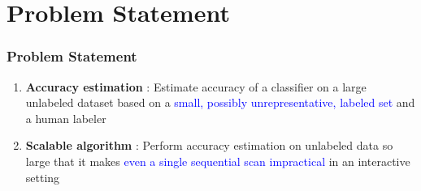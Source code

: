 \documentclass[11pt]{beamer}
\newlength{\wideitemsep}
\let\olditem\item
\renewcommand{\item}{\setlength{\itemsep}{\wideitemsep}\olditem}
\begin{document}
\section{Problem Statement}
\begin{frame}
\frametitle{Problem Statement}
\begin{enumerate}
\item \textbf{Accuracy estimation} : Estimate accuracy of a classifier on a large unlabeled dataset based on a \textcolor{blue}{small, possibly unrepresentative, labeled set} and a human labeler \vspace*{5mm}

\item \textbf{Scalable algorithm} : Perform accuracy estimation on unlabeled data so large that it makes \textcolor{blue}{even a single sequential scan impractical} in an interactive setting
\end{enumerate}
\end{frame}
\end{document}
